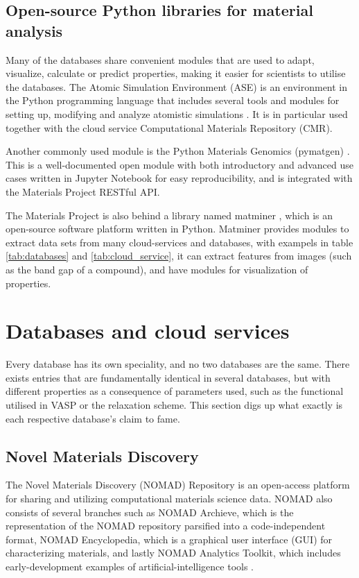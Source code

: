\subsection{Open-source Python libraries for material analysis}
Many of the databases share convenient modules that are used to adapt, visualize, calculate or predict properties, making it easier for scientists to utilise the databases.
The Atomic Simulation Environment (ASE) is an environment in the Python programming language that includes several tools and modules for setting up, modifying and analyze atomistic simulations \cite{Larsen2017}. It is in particular used together with the cloud service Computational Materials Repository (CMR).

Another commonly used module is the Python Materials Genomics (pymatgen) \cite{Ong2013}. This is a well-documented open module with both introductory and advanced use cases written in Jupyter Notebook for easy reproducibility, and is integrated with the Materials Project RESTful API.

The Materials Project is also behind a library named matminer \cite{Ward2018}, which is an open-source software platform written in Python. Matminer provides modules to extract data sets from many cloud-services and databases, with exampels in table \ref{tab:databases} and \ref{tab:cloud_service}, it can extract features from images (such as the band gap of a compound), and have modules for visualization of properties.

\section{Databases and cloud services}

Every database has its own speciality, and no two databases are the same. There exists entries that are fundamentally identical in several databases, but with different properties as a consequence of parameters used, such as the functional utilised in VASP or the relaxation scheme. This section digs up what exactly is each respective database's claim to fame.

\subsection{Novel Materials Discovery}

The Novel Materials Discovery (NOMAD) \cite{Draxl2019} Repository is an open-access platform for sharing and utilizing computational materials science data. NOMAD also consists of several branches such as NOMAD Archieve, which is the representation of the NOMAD repository parsified into a code-independent format, NOMAD Encyclopedia, which is a graphical user interface (GUI) for characterizing materials, and lastly NOMAD Analytics Toolkit, which includes early-development examples of artificial-intelligence tools \cite{Draxl2019}.

